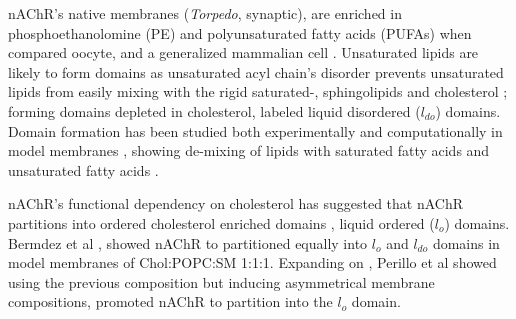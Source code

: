nAChR's native membranes (\textit{Torpedo}, synaptic)\cite{Breckenridge_Adult_1973,Cotman_Lipid_1969,8DAAC844-CF26-B5A6-FE56-AEE1F681B8A3,Quesada_Uncovering_2016}, are enriched in phosphoethanolomine (PE) and polyunsaturated fatty acids (PUFAs) when compared oocyte\cite{Hill_Isolation_2005}, and a generalized mammalian cell \cite{Inglfsson_Lipid_2014}. Unsaturated lipids are likely to form domains as unsaturated acyl chain's disorder prevents unsaturated lipids from easily mixing with the rigid saturated-, sphingolipids and cholesterol \cite{Feller_Acyl_2008,Yeagle2016115}; forming domains depleted in cholesterol, labeled liquid disordered ($l_{do}$) domains. Domain formation has been studied both experimentally and computationally in model membranes \cite{Lingwood_Lipid_2010,Kaiser_Order_2009,Ma_n_2004,Inglfsson_Lipid_2014,Risselada_The_2008}, showing de-mixing of lipids with saturated fatty acids and unsaturated fatty acids \cite{Levental_Polyunsaturated_2016,Lor2015}.




nAChR's functional dependency on cholesterol has suggested that nAChR partitions into ordered cholesterol enriched domains \cite{Bermdez_Partition_2010,Perillo_Transbilayer_2016,Pato_Role_2008,Fong_Correlation_1986,Sunshine_Lipid_1992}, liquid ordered ($l_o$) domains. Bermdez et al \cite{Bermdez_Partition_2010}, showed nAChR to partitioned equally into $l_o$ and $l_{do}$ domains in model membranes of Chol:POPC:SM 1:1:1. Expanding on \cite{Bermdez_Partition_2010}, Perillo et al \cite{Perillo_Transbilayer_2016} showed using the previous composition but inducing asymmetrical membrane compositions, promoted nAChR to partition into the $l_o$ domain.%

